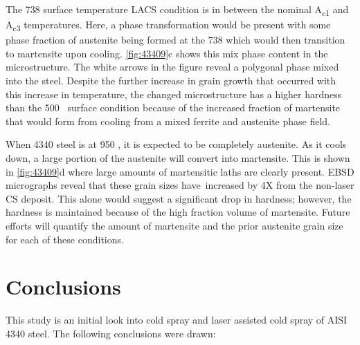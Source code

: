 The 738 \celsius{} surface temperature LACS condition is in between the nominal A\textsubscript{c1} and A\textsubscript{c3} temperatures. Here, a phase transformation would be present with some phase fraction of austenite being formed at the 738 \celsius{} which would then transition to martensite upon cooling. \ref{fig:43409}c shows this mix phase content in the microstructure. The white arrows in the figure reveal a polygonal phase mixed into the steel. Despite the further increase in grain growth that occurred with this increase in temperature, the changed microstructure has a higher hardness than the 500 \celsius{} surface condition because of the increased fraction of martensite that would form from cooling from a mixed ferrite and austenite phase field.


When 4340 steel is at 950 \celsius{}, it is expected to be completely austenite. As it cools down, a large portion of the austenite will convert into martensite. This is shown in \ref{fig:43409}d where large amounts of martensitic laths are clearly present. EBSD micrographs reveal that these grain sizes have\ increased by 4X from the non-laser CS deposit. This alone would suggest a significant drop in hardness; however, the hardness is maintained because of the high fraction volume of martensite.  Future efforts will quantify the amount of martensite and the prior austenite grain size for each of these conditions.


\section*{Conclusions}


This study is an initial look into cold spray and laser assisted cold spray of AISI 4340 steel. The following conclusions were drawn:


